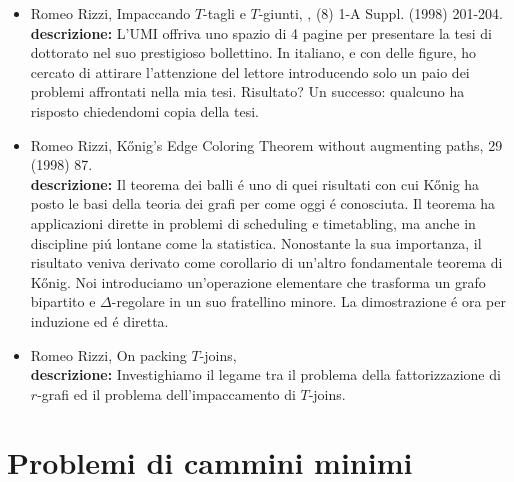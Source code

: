 \documentclass[10pt]{article}
\begin{document}
\begin{itemize}
\vspace{1.4mm}
  \item[] {\sc Romeo Rizzi},
   \newblock  Impaccando $T$-tagli e $T$-giunti,
   ,
             (8) 1-A Suppl. (1998) 201-204.\\
{\bf descrizione:}
L'UMI offriva uno spazio di 4 pagine per
presentare la tesi di dottorato nel suo prestigioso bollettino.
In italiano, e con delle figure,
ho cercato di attirare l'attenzione del lettore
introducendo solo un paio dei problemi affrontati
nella mia tesi.
Risultato? Un successo:
qualcuno ha risposto
chiedendomi copia della tesi.\\

  \vspace{1.4mm}
  \item[] {\sc Romeo Rizzi},
   \newblock  K\H{o}nig's Edge Coloring Theorem without augmenting paths,
    29 (1998) 87.\\
{\bf descrizione:}
Il teorema dei balli \'e uno di
quei risultati con cui K\H{o}nig
ha posto le basi della teoria dei grafi per come oggi \'e conosciuta.
Il teorema ha applicazioni dirette in problemi di scheduling e timetabling,
ma anche in discipline pi\'u lontane come la statistica.
Nonostante la sua importanza, il risultato veniva derivato
come corollario di un'altro fondamentale teorema di K\H{o}nig.
Noi introduciamo  un'operazione elementare che
trasforma un grafo bipartito e $\Delta$-regolare
in un suo fratellino minore.
La dimostrazione \'e ora per induzione
ed \'e diretta.\\

  \vspace{1.4mm}
  \item[] {\sc Romeo Rizzi},
   \newblock  On packing $T$-joins,
   \\
{\bf descrizione:}
Investighiamo il legame tra
il problema della fattorizzazione di $r$-grafi
ed il problema dell'impaccamento di $T$-joins.
\end{itemize}



\section{Problemi di cammini minimi}
\end{document}
